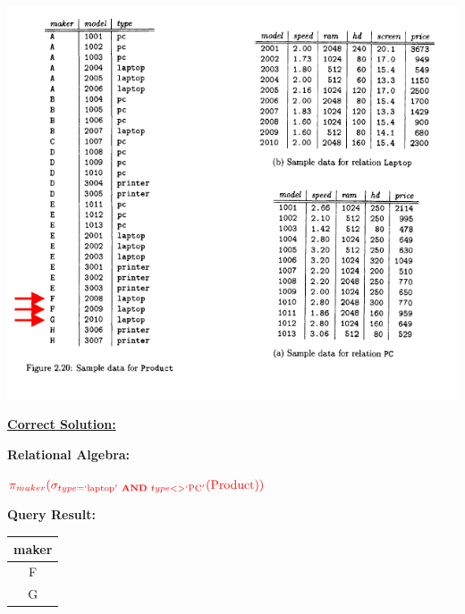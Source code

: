 \documentclass[12pt]{article}
\begin{document}
\begin{enumerate}
\begin{enumerate}[a)]
        \begin{center}
        \includegraphics[width=\linewidth]{images/worksheet_2_solution_10.png}
        \end{center}

        \bigskip

        \begin{mdframed}
            \underline{\textbf{Correct Solution:}}

            \bigskip

            \color{red}

            \textbf{Relational Algebra:}

            \bigskip

            $\color{red}\pi_{maker}(\sigma_{type = `\text{laptop}' \textbf{ AND } type <> `\text{PC}'}(\text{Product}))$

            \bigskip

            \textbf{Query Result:}

            \bigskip

            \begin{tabular}{|c|}
                \hline
                maker\\
                \hline
                F\\
                \hline
                G\\
                \hline
            \end{tabular}
            \color{black}


\end{mdframed}
\end{enumerate}
\end{enumerate}
\end{document}
